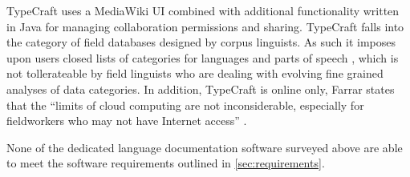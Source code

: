 \documentclass[11pt]{article}
\begin{document}
TypeCraft uses a MediaWiki UI combined with additional functionality written in Java for managing collaboration permissions and sharing. TypeCraft falls into the category of field databases designed by corpus linguists. As such it imposes upon users closed lists of categories for languages and parts of speech \cite{Farrar:2010}, which is not tollerateable by field linguists who are dealing with evolving fine grained analyses of data categories. In addition, TypeCraft is online only, Farrar states that the ``limits of cloud computing are not inconsiderable, especially for fieldworkers who may not have Internet access'' \cite{Farrar:2010}.


None of the dedicated language documentation software surveyed above are able to meet the software requirements outlined in \autoref{sec:requirements}.





\end{document}
